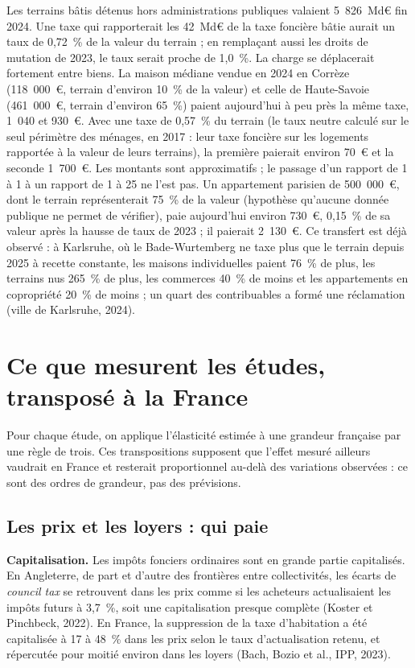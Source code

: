 \documentclass[11pt,a4paper]{article}
\begin{document}
Les terrains bâtis détenus hors administrations publiques valaient 5~826~Md€ fin 2024. Une taxe
qui rapporterait les 42~Md€ de la taxe foncière bâtie aurait un taux de 0,72~\% de la valeur du
terrain ; en remplaçant aussi les droits de mutation de 2023, le taux serait proche de 1,0~\%. La
charge se déplacerait fortement entre biens. La maison médiane vendue en 2024 en Corrèze
(118~000~€, terrain d'environ 10~\% de la valeur) et celle de Haute-Savoie (461~000~€, terrain
d'environ 65~\%) paient aujourd'hui à peu près la même taxe, 1~040 et 930~€. Avec une taxe de
0,57~\% du terrain (le taux neutre calculé sur le seul périmètre des ménages, en 2017 : leur taxe
foncière sur les logements rapportée à la valeur de leurs terrains), la première paierait environ 70~€ et la seconde 1~700~€. Les montants sont
approximatifs ; le passage d'un rapport de 1 à 1 à un rapport de 1 à 25 ne l'est pas. Un
appartement parisien de 500~000~€, dont le terrain représenterait 75~\% de la valeur (hypothèse
qu'aucune donnée publique ne permet de vérifier), paie aujourd'hui environ 730~€, 0,15~\% de sa
valeur après la hausse de taux de 2023 ; il paierait 2~130~€. Ce transfert est déjà observé : à
Karlsruhe, où le Bade-Wurtemberg ne taxe plus que le terrain depuis 2025 à recette constante, les
maisons individuelles paient 76~\% de plus, les terrains nus 265~\% de plus, les commerces 40~\% de
moins et les appartements en copropriété 20~\% de moins ; un quart des contribuables a formé une
réclamation (ville de Karlsruhe, 2024).

\section{Ce que mesurent les études, transposé à la France}\label{sec:etudes}

Pour chaque étude, on applique l'élasticité estimée à une grandeur française par une règle de
trois. Ces transpositions supposent que l'effet mesuré ailleurs vaudrait en France et resterait
proportionnel au-delà des variations observées : ce sont des ordres de grandeur, pas des
prévisions.

\subsection{Les prix et les loyers : qui paie}

\textbf{Capitalisation.} Les impôts fonciers ordinaires sont en grande partie capitalisés. En
Angleterre, de part et d'autre des frontières entre collectivités, les écarts de \emph{council tax}
se retrouvent dans les prix comme si les acheteurs actualisaient les impôts futurs à 3,7~\%, soit une
capitalisation presque complète (Koster et Pinchbeck, 2022). En France, la suppression de la taxe d'habitation a été capitalisée
à 17 à 48~\% dans les prix selon le taux d'actualisation retenu, et répercutée pour moitié environ
dans les loyers (Bach, Bozio et
al., IPP, 2023).
\end{document}
